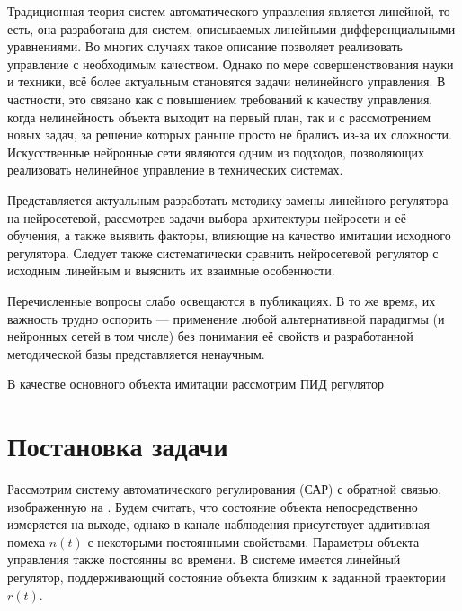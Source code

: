 
\label{nnc_pre}

Традиционная теория систем автоматического управления является
линейной, то есть, она разработана для систем, описываемых линейными
дифференциальными уравнениями.  Во многих случаях такое описание
позволяет реализовать управление с необходимым качеством.  Однако по
мере совершенствования науки и техники, всё более актуальным
становятся задачи нелинейного управления.  В частности, это связано
как с повышением требований к качеству управления, когда нелинейность
объекта выходит на первый план, так и с рассмотрением новых задач, за
решение которых раньше просто не брались из-за их сложности.
Искусственные нейронные сети являются одним из подходов, позволяющих
реализовать нелинейное управление в технических системах.


Представляется актуальным разработать методику замены линейного
регулятора на нейросетевой, рассмотрев задачи выбора архитектуры
нейросети и её обучения, а также выявить факторы, влияющие на качество
имитации исходного регулятора.  Следует также систематически сравнить
нейросетевой регулятор с исходным линейным и выяснить их взаимные
особенности.

Перечисленные вопросы слабо освещаются в публикациях.  В то же время,
их важность трудно оспорить --- применение любой альтернативной
парадигмы (и нейронных сетей в том числе) без понимания её свойств и
разработанной методической базы представляется ненаучным.

В качестве основного объекта имитации рассмотрим ПИД регулятор 

\section{Постановка задачи}

Рассмотрим систему автоматического регулирования (САР) с обратной
связью, изображенную на .  Будем считать, что
состояние объекта непосредственно измеряется на выходе, однако в
канале наблюдения присутствует аддитивная помеха $n(t)$ с некоторыми
постоянными свойствами.  Параметры объекта управления также постоянны
во времени.  В системе имеется линейный регулятор, поддерживающий
состояние объекта близким к заданной траектории $r(t)$.

